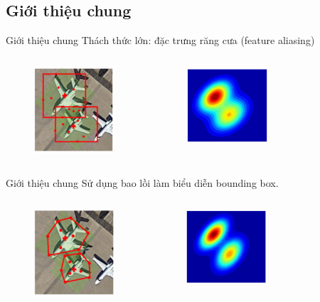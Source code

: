 \documentclass[11pt]{beamer}
\theoremstyle{definition}
\theoremstyle{plain}
\theoremstyle{plain}
\theoremstyle{remark}
\begin{document}
	\subsection{Giới thiệu chung}
	\begin{frame}{Giới thiệu chung}
			Thách thức lớn: đặc trưng răng cưa (feature aliasing)
			\begin{columns}[c] %
			\begin{figure}
				\centering
				\includegraphics[width=3cm]{reppoint_bouding_box.jpg}
		
			\end{figure}
			\begin{figure}
				\centering
				\includegraphics[width=3cm]{reception_field_w_aliasing.jpg}
			
			\end{figure}
		\end{columns}
	\end{frame}
		\begin{frame}{Giới thiệu chung}
		Sử dụng bao lồi làm biểu diễn bounding box.
		\begin{columns}[c] %
			\begin{figure}
				\centering
				\includegraphics[width=3cm]{ConvexHull_Bouding_Box.jpg}
			
			\end{figure}
			
			\begin{figure}
				\centering
				\includegraphics[width=3cm]{reception_field_wo_aliasing.jpg}
			
			\end{figure}
		\end{columns}
	\end{frame}
\end{document}
